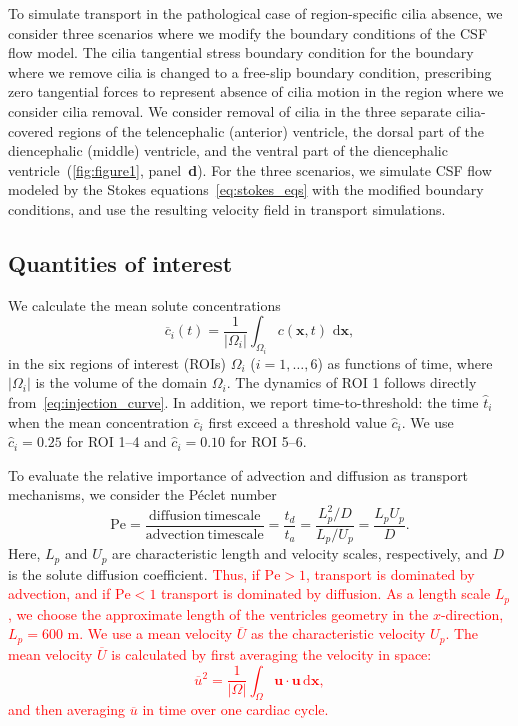 \documentclass[fleqn]{wlscirep}
\newcommand{\dx}{\, \mathrm d\bm{x}}
\newcommand{\uu}{\mathbf{u}}
\newcommand{\xx}{\bm{x}}
\newcommand{\fixme}[1]{\textcolor{red}{#1}}
\begin{document}
To simulate transport in the pathological case of region-specific cilia absence, we consider three scenarios where we modify the boundary conditions of the CSF flow model. The cilia tangential stress boundary condition for the boundary where we remove cilia is changed to a free-slip boundary condition, prescribing zero tangential forces to represent absence of cilia motion in the region where we consider cilia removal. We consider removal of cilia in the three separate cilia-covered regions of the telencephalic (anterior) ventricle, the dorsal part of the diencephalic (middle) ventricle, and the ventral part of the diencephalic ventricle~(\cref{fig:figure1}, panel~\textbf{d}). For the three scenarios, we simulate CSF flow modeled by the Stokes equations~\eqref{eq:stokes_eqs} with the modified boundary conditions, and use the resulting velocity field in transport simulations.


\subsection*{Quantities of interest}
We calculate the mean solute concentrations
\begin{equation}
    \overline{c}_i(t) = \frac{1}{|\Omega_i|}\int_{\Omega_i} c(\xx, t)\,\dx,
    \label{eq:c_mean_i}
\end{equation}
in the six regions of interest (ROIs) $\Omega_i$ ($i = 1, \dots, 6$) as functions of time, where $|\Omega_i|$ is the volume of the domain $\Omega_i$. The dynamics of ROI 1 follows directly from~\eqref{eq:injection_curve}. In addition, we report time-to-threshold: the time $\hat{t}_i$ when the mean concentration $\overline{c}_i$ first exceed a threshold value $\hat{c}_i$. We use $\hat{c}_i=0.25$ for ROI 1--4 and $\hat{c}_i=0.10$ for ROI 5--6.

To evaluate the relative importance of advection and diffusion as transport mechanisms, we consider the Péclet number
\begin{equation*}
    \mathrm{Pe} = \frac{\mathrm{diffusion \ timescale}}{\mathrm{advection \ timescale}} = \frac{t_d}{t_a} = \frac{L_p^2/D}{L_p/U_p} = \frac{L_p U_p}{D}.
\end{equation*}
Here, $L_p$ and $U_p$ are characteristic length and velocity scales, respectively, and $D$ is the solute diffusion coefficient. \fixme{Thus, if $\mathrm{Pe} > 1$, transport is dominated by advection, and if $\mathrm{Pe} < 1$ transport is dominated by diffusion. As a length scale $L_p$, we choose the approximate length of the ventricles geometry in the $x$-direction, $L_p=600$ \textmu m. We use a mean velocity $\overline{U}$ as the characteristic velocity $U_p$. The mean velocity $\overline{U}$ is calculated by first averaging the velocity in space:
\begin{equation*}
    \overline{u}^2 = \frac{1}{|\Omega|}\int_{\Omega}\uu\cdot\uu\dx,
\end{equation*}
and then averaging $\overline{u}$ in time over one cardiac cycle.}
\end{document}
